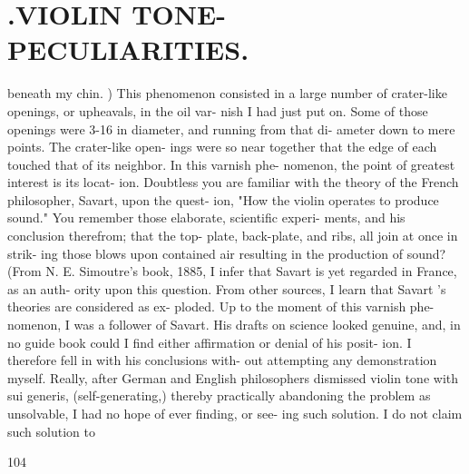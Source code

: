 \documentclass{article}
\begin{document}
\section*{.VIOLIN TONE-PECULIARITIES.}
beneath my chin. ) This phenomenon consisted in a large number of crater-like openings, or upheavals, in the oil var- nish I had just put on. Some of those openings were 3-16 in diameter, and running from that di- ameter down to mere points. The crater-like open- ings were so near together that the edge of each touched that of its neighbor. In this varnish phe- nomenon, the point of greatest interest is its locat- ion. Doubtless you are familiar with the theory of the French philosopher, Savart, upon the quest- ion, "How the violin operates to produce sound." You remember those elaborate, scientific experi- ments, and his conclusion therefrom; that the top- plate, back-plate, and ribs, all join at once in strik- ing those blows upon contained air resulting in the production of sound? (From N. E. Simoutre's book, 1885, I infer that Savart is yet regarded in France, as an auth- ority upon this question. From other sources, I learn that Savart 's theories are considered as ex- ploded. Up to the moment of this varnish phe- nomenon, I was a follower of Savart. His drafts on science looked genuine, and, in no guide book could I find either affirmation or denial of his posit- ion. I therefore fell in with his conclusions with- out attempting any demonstration myself. Really, after German and English philosophers dismissed violin tone with sui generis, (self-generating,) thereby practically abandoning the problem as unsolvable, I had no hope of ever finding, or see- ing such solution. I do not claim such solution to

104
\end{document}
